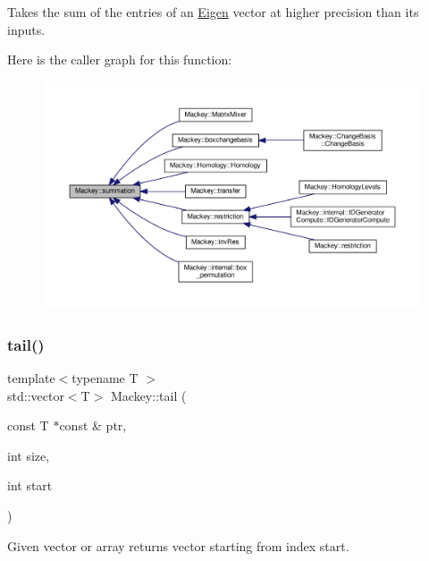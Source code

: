 Takes the sum of the entries of an \hyperlink{namespaceEigen}{Eigen} vector at higher precision than its inputs. 

Here is the caller graph for this function\+:\nopagebreak
\begin{figure}[H]
\begin{center}
\leavevmode
\includegraphics[width=350pt]{namespaceMackey_a359aa27a035d2b1f1a3f2f8270fc9e52_icgraph}
\end{center}
\end{figure}
\mbox{\label{namespaceMackey_a1e4b11e9d2a5b70f8380af87cae31ef3}} 
\subsubsection{\texorpdfstring{tail()}{tail()}}
{\footnotesize\ttfamily template$<$typename T $>$ \\
std\+::vector$<$T$>$ Mackey\+::tail (\begin{DoxyParamCaption}\item[{const T $\ast$const \&}]{ptr,  }\item[{int}]{size,  }\item[{int}]{start }\end{DoxyParamCaption})\hspace{0.3cm}{\ttfamily [inline]}}



Given vector or array returns vector starting from index start. 

